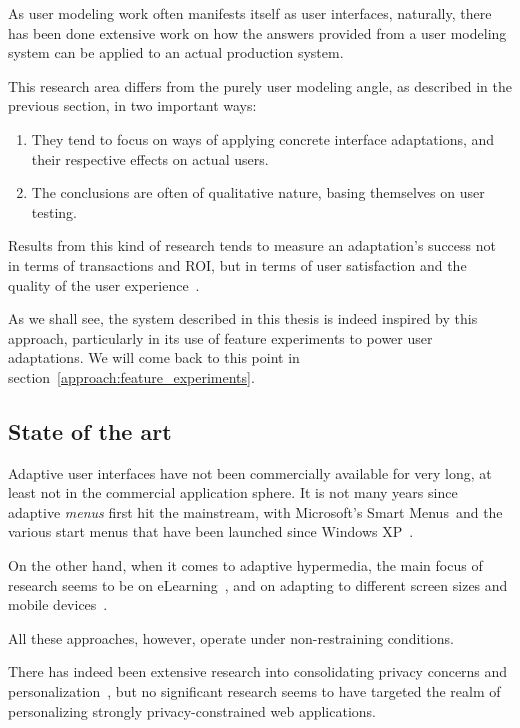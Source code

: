     As user modeling work often manifests itself as user interfaces, naturally, there has been done extensive work on how the answers provided from a user modeling system can be applied to an actual production system.

    This research area differs from the purely user modeling angle, as described in the previous section, in two important ways:

    \begin{enumerate}
      \item They tend to focus on ways of applying concrete interface adaptations, and their respective effects on actual users.
      \item The conclusions are often of qualitative nature, basing themselves on user testing.
    \end{enumerate}

    Results from this kind of research tends to measure an adaptation's success not in terms of transactions and ROI, but in terms of user satisfaction and the quality of the user experience~\cite{Gajos2006,Findlater2008}.

    As we shall see, the system described in this thesis is indeed inspired by this approach, particularly in its use of feature experiments to power user adaptations. We will come back to this point in section~\ref{approach:feature_experiments}.

  \subsection{State of the art}

    Adaptive user interfaces have not been commercially available for very long, at least not in the commercial application sphere. It is not many years since adaptive \emph{menus} first hit the mainstream, with Microsoft's Smart Menus\texttrademark\ and the various start menus that have been launched since Windows XP~\cite{Gajos2006}.

    On the other hand, when it comes to adaptive hypermedia, the main focus of research seems to be on eLearning~\cite{Vrieze}, and on adapting to different screen sizes and mobile devices~\cite{Findlater2008}.

    All these approaches, however, operate under non-restraining conditions.

    There has indeed been extensive research into consolidating privacy concerns and personalization~\cite{Kobsa2007,Wang2012,Knijnenburg2013}, but no significant research seems to have targeted the realm of personalizing strongly privacy-constrained web applications.
